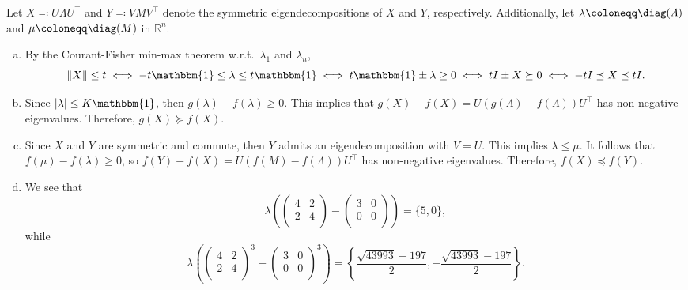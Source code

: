\begin{answer}
	Let \(X \eqqcolon U \varLambda U^{\top}\) and \(Y\eqqcolon V M V^{\top}\) denote the symmetric eigendecompositions of \(X\) and \(Y\), respectively. Additionally, let \(\lambda \coloneqq \diag(\varLambda )\) and \(\mu\coloneqq \diag(M)\) in \(\mathbb{R} ^n\).
	\begin{enumerate}[(a)]
		\item By the Courant-Fisher min-max theorem w.r.t.\ \(\lambda_1\) and \(\lambda_n\),
		      \[
			      \lVert X \rVert \leq t
			      \iff - t \mathbbm{1}  \leq \lambda \leq t \mathbbm{1}
			      \iff t \mathbbm{1}  \pm \lambda \geq 0
			      \iff tI \pm X \succeq 0
			      \iff -tI \preceq X \preceq tI.
		      \]
		\item Since \(\lvert \lambda \rvert \leq K \mathbbm{1} \), then \(g(\lambda)-f(\lambda)\geq 0\). This implies that \(g(X)-f(X)=U(g(\varLambda )-f(\varLambda ))U^{\top}\) has non-negative eigenvalues. Therefore, \(g(X)\succeq f(X)\).
		\item Since \(X\) and \(Y\) are symmetric and commute, then \(Y\) admits an eigendecomposition with \(V=U\). This implies \(\lambda\leq\mu\). It follows that \(f(\mu)-f(\lambda)\geq 0\), so
		      \(f(Y)-f(X)=U(f(M)-f(\varLambda ))U^{\top}\) has non-negative eigenvalues. Therefore, \(f(X) \preceq f(Y)\).
		\item We see that
		      \[
			      \lambda \left( \begin{pmatrix}
					      4 & 2 \\
					      2 & 4 \\
				      \end{pmatrix} - \begin{pmatrix}
					      3 & 0 \\
					      0 & 0 \\
				      \end{pmatrix} \right) = \{ 5, 0 \} ,
		      \]
		      while
		      \[
			      \lambda \left( \begin{pmatrix}
					      4 & 2 \\
					      2 & 4 \\
				      \end{pmatrix}^3 - \begin{pmatrix}
					      3 & 0 \\
					      0 & 0 \\
				      \end{pmatrix}^3 \right) = \left\{ \frac{\sqrt{43993} + 197}{2} , - \frac{\sqrt{43993} - 197}{2}\right\} .
\]
\end{enumerate}
\end{answer}

